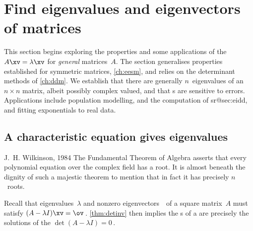 

\section{Find eigenvalues and eigenvectors of matrices}
\label{sec:eennm}

\secttoc

This section begins exploring the properties and some applications of the  \(A\xv=\lambda\xv\) for \emph{general} matrices~\(A\).
The section generalises properties established for symmetric matrices, \cref{ch:eesm}, and relies on the determinant methods of \autoref{ch:ddm}.
We establish that there are generally \(n\)~eigenvalues of an \(n\times n\) matrix, albeit possibly complex valued, and that s are sensitive to errors.
Applications include population modelling, and 
the computation of \svd{}s\ifcsname r@sec:eidd\endcsname, and 
fitting exponentials to real data\fi.




\subsection{A characteristic equation gives eigenvalues}
\label{sec:cege}

\begin{quoted}{J.~H. Wilkinson, 1984 \cite[p.103]{Higham1996}}
The Fundamental Theorem of Algebra asserts that every polynomial equation over the complex field has a root.  
It is almost beneath the dignity of such a majestic theorem to mention that in fact it has precisely \(n\)~roots.
\end{quoted}


Recall that eigenvalues~\(\lambda\) and nonzero eigenvectors~\xv\ of a square matrix~\(A\) must satisfy \((A-\lambda I)\xv=\ov\)\,.
\autoref{thm:detinv} then implies the s of a  are precisely the solutions of the  \(\det(A-\lambda I)=0\)\,.  

